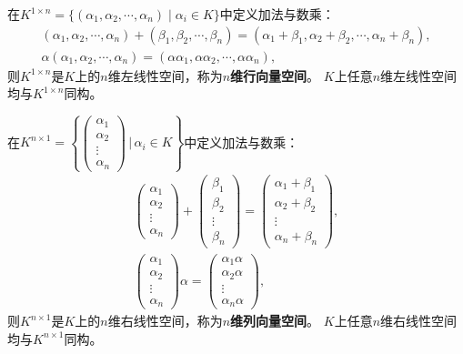 \documentclass[../../main.tex]{subfiles}%
\begin{document}
\begin{example}
在$K^{1\times n}=\{(\alpha_1,\alpha_2,\cdots,\alpha_n)\mid\alpha_i\in K\}$中定义加法与数乘：
\begin{align*}
(\alpha_1,\alpha_2,\cdots,\alpha_n)+(\beta_1,\beta_2,\cdots,\beta_n)=(\alpha_1+\beta_1,\alpha_2+\beta_2,\cdots,\alpha_n+\beta_n),\\
\alpha(\alpha_1,\alpha_2,\cdots,\alpha_n)=(\alpha\alpha_1,\alpha\alpha_2,\cdots,\alpha\alpha_n),
\end{align*}
则$K^{1\times n}$是$K$上的$n$维左线性空间，称为\textbf{$n$维行向量空间}。
$K$上任意$n$维左线性空间均与$K^{1\times n}$同构。
\end{example}

\begin{example}
在$K^{n\times1}=\left\{\begin{pmatrix}\alpha_1\\\alpha_2\\\vdots\\\alpha_n\end{pmatrix}\,\bigg|\,\alpha_i\in K\right\}$中定义加法与数乘：
\begin{align*}
\begin{pmatrix}\alpha_1\\\alpha_2\\\vdots\\\alpha_n\end{pmatrix}+\begin{pmatrix}\beta_1\\\beta_2\\\vdots\\\beta_n\end{pmatrix}=\begin{pmatrix}\alpha_1+\beta_1\\\alpha_2+\beta_2\\\vdots\\\alpha_n+\beta_n\end{pmatrix},\\
\begin{pmatrix}\alpha_1\\\alpha_2\\\vdots\\\alpha_n\end{pmatrix}\alpha=\begin{pmatrix}\alpha_1\alpha\\\alpha_2\alpha\\\vdots\\\alpha_n\alpha\end{pmatrix},
\end{align*}
则$K^{n\times1}$是$K$上的$n$维右线性空间，称为\textbf{$n$维列向量空间}。
$K$上任意$n$维右线性空间均与$K^{n\times1}$同构。
\end{example}
\end{document}

